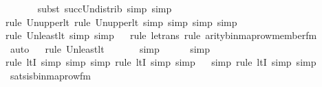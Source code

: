 \begin{isabellebody}
\ \ \ \ \ \ \isamarkupfalse%
{\isacharparenleft}{\kern0pt}subst\ succ{\isacharunderscore}{\kern0pt}Un{\isacharunderscore}{\kern0pt}distrib{\isacharcomma}{\kern0pt}\ simp{\isacharcomma}{\kern0pt}\ simp{\isacharparenright}{\kern0pt}{\isacharplus}{\kern0pt}\isanewline
\ \ \ \ \ \isamarkupfalse%
{\isacharparenleft}{\kern0pt}rule\ Un{\isacharunderscore}{\kern0pt}upper{}{\isacharunderscore}{\kern0pt}lt{\isacharcomma}{\kern0pt}\ rule\ Un{\isacharunderscore}{\kern0pt}upper{}{\isacharunderscore}{\kern0pt}lt{\isacharcomma}{\kern0pt}\ simp{\isacharcomma}{\kern0pt}\ simp{\isacharcomma}{\kern0pt}\ simp{\isacharcomma}{\kern0pt}\ simp{\isacharparenright}{\kern0pt}\isanewline
\ \ \ \isamarkupfalse%
{\isacharparenleft}{\kern0pt}rule\ Un{\isacharunderscore}{\kern0pt}least{\isacharunderscore}{\kern0pt}lt{\isacharcomma}{\kern0pt}\ simp{\isacharcomma}{\kern0pt}\ simp{\isacharparenright}{\kern0pt}\isanewline
\ \ \isamarkupfalse%
{\isacharparenleft}{\kern0pt}rule\ le{\isacharunderscore}{\kern0pt}trans{\isacharcomma}{\kern0pt}\ rule\ arity{\isacharunderscore}{\kern0pt}binmap{\isacharunderscore}{\kern0pt}row{\isacharprime}{\kern0pt}{\isacharunderscore}{\kern0pt}member{\isacharunderscore}{\kern0pt}fm{\isacharparenright}{\kern0pt}\isanewline
\ \ \ \ \ \ \isamarkupfalse%
\ auto{\isacharbrackleft}{\kern0pt}{}{\isacharbrackright}{\kern0pt}\isanewline
\ \ \isamarkupfalse%
{\isacharparenleft}{\kern0pt}rule\ Un{\isacharunderscore}{\kern0pt}least{\isacharunderscore}{\kern0pt}lt{\isacharparenright}{\kern0pt}{\isacharplus}{\kern0pt}\isanewline
\ \ \ \ \ \isamarkupfalse%
\ simp\isanewline
\ \ \ \ \isamarkupfalse%
\ simp\isanewline
\ \ \ \ \isamarkupfalse%
{\isacharparenleft}{\kern0pt}rule\ ltI{\isacharcomma}{\kern0pt}\ simp{\isacharcomma}{\kern0pt}\ simp{\isacharcomma}{\kern0pt}\ simp{\isacharcomma}{\kern0pt}\ rule\ ltI{\isacharcomma}{\kern0pt}\ simp{\isacharcomma}{\kern0pt}\ simp{\isacharparenright}{\kern0pt}\isanewline
\ \ \isamarkupfalse%
{\isacharparenleft}{\kern0pt}simp{\isacharcomma}{\kern0pt}\ rule\ ltI{\isacharcomma}{\kern0pt}\ simp{\isacharcomma}{\kern0pt}\ simp{\isacharparenright}{\kern0pt}\isanewline
\ \ \isamarkupfalse%
%
\endisatagproof
{\isafoldproof}%
%
\isadelimproof
\isanewline
%
\endisadelimproof
\isanewline
{}\isamarkupfalse%
\ sats{\isacharunderscore}{\kern0pt}is{\isacharunderscore}{\kern0pt}binmap{\isacharunderscore}{\kern0pt}row{\isacharprime}{\kern0pt}{\isacharunderscore}{\kern0pt}fm\ {\isacharcolon}{\kern0pt}\ \isanewline

\end{isabellebody}

